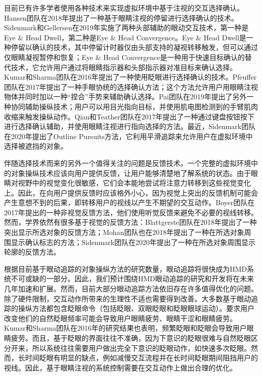 目前已有许多学者使用各种技术来实现虚拟环境中基于注视的交互选择确认。Hansen团队在2018年提出了一种基于眼睛注视的停留进行选择确认的技术。Sidenmark和Gellersen在2019年实施了两种头部辅助的眼动交互技术，第一种是Eye \& Head Dwell，第二种是Eye \& Head Convergence。Eye \& Head Dwell是一种停留以确认的技术，其中停留计时器仅由头部支持的凝视转移触发，但可以通过仅眼睛凝视暂停和恢复；Eye \& Head Convergence是一种用于快速目标确认的替代技术，它允许用户通过将眼睛指示器和头部指示器对准目标来确认选择。Kumar和Sharma团队在2016年提出了一种使用眨眼进行选择确认的技术。Pfeuffer团队在2017年提出了一种手眼协统的选择确认方法；这个方法允许用户用眼睛注视物体并同时加以一种“捏合”手势来辅助确认选择。Pai团队在2019年提出了另外一种协同辅助操纵技术；用户可以用目光指向目标，并使用肌电图检测到的手臂肌肉收缩来触发操纵动作。Qian和Teather团队在2017年提出了一种通过键盘按钮按下进行选择确认辅助，并使用眼睛注视进行指向选择的方法。最近，Sidenmark团队在2020年提出了Outline Pursuits方法，它利用平滑追踪来允许用户在虚拟环境中选择被遮挡的对象。

伴随选择技术而来的另外一个值得关注的问题是反馈技术。一个完整的虚拟环境中的对象操纵技术应该向用户提供反馈，让用户能够清楚地了解系统的状态。由于眼睛对视野中的视觉变化很敏感，它们会本能地尝试将注意力转移到这些视觉变化上。因此，在向用户提供反馈时应该格外小心，因为视觉上突出的反馈机制可能会产生意想不到的后果，即转移用户的视线以产生不期望的交互动作。Boyer团队在2017年提出的一种非视觉反馈方法，他们使用听觉反馈来避免不必要的视线转移。然而，学界依然有很多基于视觉的反馈方法：Blattgerste团队在2018年提出了一种突出显示所选对象的反馈方法；Mohan团队也在2018年提出了一种在所选对象周围显示确认标志的方法；Sidenmark团队在2020年提出了一种在所选对象周围显示轮廓的反馈方法。

根据目前基于眼动追踪的对象操纵方法的研究数量，眼动追踪将很快成为HMD系统不可或缺的一部分。因此，我们预计围绕HMD眼动追踪的研究和开发将在未来几年加速和扩展。然而，目前大部分眼动追踪方法依旧存在许多值得优化的问题。除了硬件限制，交互动作所带来的生理性不适也需要得到改善。大多数基于眼动追踪的操纵方法都包含眨眼命令（包括眨眼、双眼眨眼和眨眼眼球运动）。要求用户改变他们的自然眨眼频率可能会导致用户眼睛疲劳、眼睛干涩和眼睛疲劳。Kumar和Sharma团队在2016年的研究结果也表明，频繁眨眼和眨眼会导致用户眼睛疲劳。而且，基于眨眼的界面往往不准确，因为下意识的眨眼很难与自然眨眼区分开来，所以系统往往需要用户做出完全下意识的眨眼动作，如快速多次眨眼。然而，长时间眨眼有明显的缺点，例如减慢交互流程并在长时间眨眼期间阻挡用户的视线。因此，基于眼睛注视的系统控制需要在交互动作上做出合理的优化。

